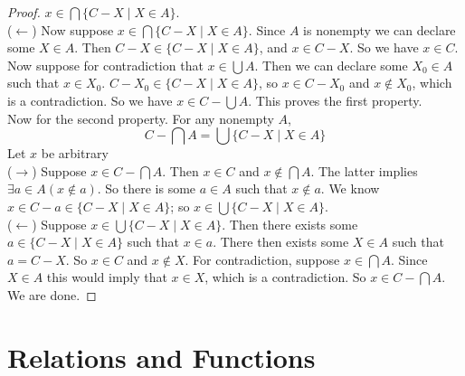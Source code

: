\documentclass{report}
\begin{document}
\begin{proof}
$x\in\bigcap\{C-X\mid X\in A\}$.\\
\indent($\leftarrow$) Now suppose $x\in\bigcap\{C-X\mid X\in A\}$. Since $A$ is nonempty we can declare some $X\in A$. Then $C-X\in\{C-X\mid X\in A\}$, and $x\in C-X$. So we have $x\in C$.
Now suppose for contradiction that $x\in\bigcup A$. Then we can declare some $X_0\in A$ such that $x\in X_0$. $C-X_0\in\{C-X\mid X\in A\}$, so $x\in C-X_0$ and $x\notin X_0$, which is a 
contradiction. So we have $x\in C-\bigcup A$. This proves the first property.\\
\indent Now for the second property. For any nonempty $A$,
\begin{equation*}
C-\bigcap A=\bigcup\{C-X\mid X\in A\}
\end{equation*}
Let $x$ be arbitrary\\
\indent($\rightarrow$) Suppose $x\in C-\bigcap A$. Then $x\in C$ and $x\notin\bigcap A$. The latter implies $\exists a\in A(x\notin a)$. So there is some $a\in A$ such that $x\notin a$.
We know $x\in C-a\in\{C-X\mid X\in A\}$; so $x\in\bigcup\{C-X\mid X\in A\}$.\\
\indent($\leftarrow$) Suppose $x\in\bigcup\{C-X\mid X\in A\}$. Then there exists some $a\in\{C-X\mid X\in A\}$ such that $x\in a$. There then exists some $X\in A$ such that $a=C-X$.
So $x\in C$ and $x\notin X$. For contradiction, suppose $x\in\bigcap A$. Since $X\in A$ this would imply that $x\in X$, which is a contradiction. So $x\in C-\bigcap A$. We are done.
\end{proof}
\newpage

\chapter{Relations and Functions}
\end{document}
